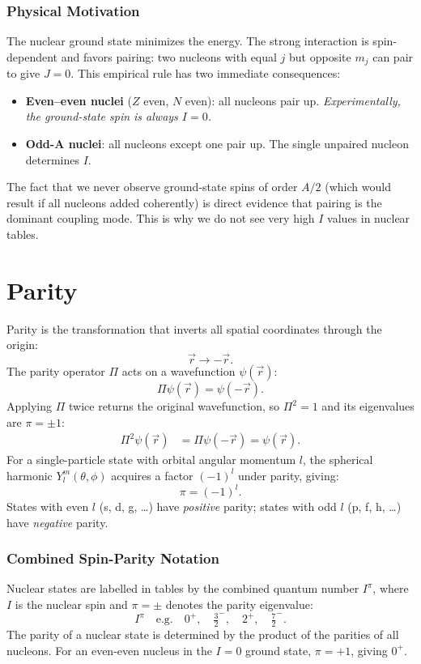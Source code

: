 \subsubsection*{Physical Motivation}
The nuclear ground state minimizes the energy.  The strong interaction is spin-dependent and favors pairing: two nucleons with equal $j$ but opposite $m_j$ can pair to give $J=0$.  This empirical rule has two immediate consequences:
\begin{itemize}
  \item \textbf{Even--even nuclei} ($Z$ even, $N$ even): all nucleons pair up.  \emph{Experimentally, the ground-state spin is always $I=0$.}
  \item \textbf{Odd-A nuclei}: all nucleons except one pair up.  The single unpaired nucleon determines $I$.
\end{itemize}
The fact that we never observe ground-state spins of order $A/2$ (which would result if all nucleons added coherently) is direct evidence that pairing is the dominant coupling mode. This is why we do not see very high $I$ values in nuclear tables.

\section*{Parity}
\label{sec:lec03:parity}

Parity is the transformation that inverts all spatial coordinates through the origin:
\[\vec{r} \to -\vec{r}.\]
The parity operator $\Pi$ acts on a wavefunction $\psi(\vec{r})$:
\[\Pi \psi(\vec{r}) = \psi(-\vec{r}).\]
Applying $\Pi$ twice returns the original wavefunction, so $\Pi^2 = 1$ and its eigenvalues are $\pi = \pm 1$:
\begin{align}
  \Pi^2 \psi(\vec{r}) &= \Pi\psi(-\vec{r}) = \psi(\vec{r}).
\end{align}
For a single-particle state with orbital angular momentum $l$, the spherical harmonic $Y_l^m(\theta,\phi)$ acquires a factor $(-1)^l$ under parity, giving:
\begin{equation}
  \label{eq:parity_orbital}
  \pi = (-1)^l.
\end{equation}
States with even $l$ (s, d, g, \ldots) have \emph{positive} parity; states with odd $l$ (p, f, h, \ldots) have \emph{negative} parity.

\subsubsection*{Combined Spin-Parity Notation}
Nuclear states are labelled in tables by the combined quantum number $I^\pi$, where $I$ is the nuclear spin and $\pi = \pm$ denotes the parity eigenvalue:
\[
  I^\pi \quad \text{e.g.}\quad 0^+,\quad \tfrac{3}{2}^-,\quad 2^+,\quad \tfrac{7}{2}^-.
\]
The parity of a nuclear state is determined by the product of the parities of all nucleons. For an even-even nucleus in the $I=0$ ground state, $\pi = +1$, giving $0^+$.

